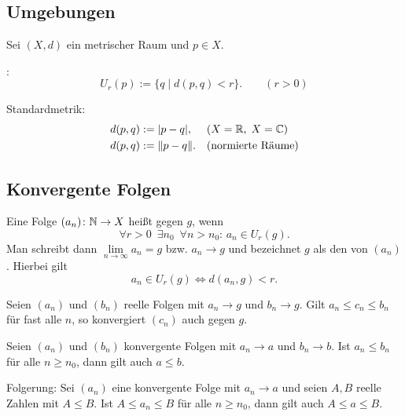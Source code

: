 \subsection{Umgebungen}

Sei $(X,d)$ ein metrischer Raum und $p\in X$.

\begin{definition}\mbox{}\newline
{}:
\begin{equation}
U_r(p) := \{q\mid d(p,q)<r\}.\qquad (r>0)
\end{equation}
\end{definition}
Standardmetrik:
\begin{align}
d(p,q) &:= |p-q|,\quad\; (\text{$X=\mathbb R$,\;\,$X=\mathbb C$})\\
d(p,q) &:=\|p-q\|.\quad (\text{normierte Räume})
\end{align}

\subsection{Konvergente Folgen}
\begin{definition}\mbox{}\newline
Eine Folge $(a_n)\colon \mathbb N\to X$ heißt  gegen $g$,
wenn%
\begin{equation}\label{eq:konvergent}
\forall r{>}0\enspace\exists n_0\enspace\forall n{>}n_0\colon\,
a_n\in U_r(g).
\end{equation}
Man schreibt dann $\lim\limits_{n\to\infty} a_n=g$ bzw. $a_n\to g$
und bezeichnet $g$ als den 
von $(a_n)$.
Hierbei gilt
\begin{equation}
a_n\in U_r(g)\iff d(a_n,g)<r.
\end{equation}
\end{definition}
 Seien $(a_n)$ und $(b_n)$ reelle Folgen
mit $a_n\to g$ und $b_n\to g$. Gilt $a_n\le c_n\le b_n$ für fast alle
$n$, so konvergiert $(c_n)$ auch gegen $g$.

\minisection{}
Seien $(a_n)$ und $(b_n)$ konvergente Folgen mit $a_n\to a$ und
$b_n\to b$. Ist $a_n\le b_n$ für alle $n\ge n_0$, dann gilt auch
$a\le b$.

Folgerung: Sei $(a_n)$ eine konvergente Folge mit $a_n\to a$ und
seien $A,B$ reelle Zahlen mit $A\le B$. Ist $A\le a_n\le B$ für alle
$n\ge n_0$, dann gilt auch $A\le a\le B$.

